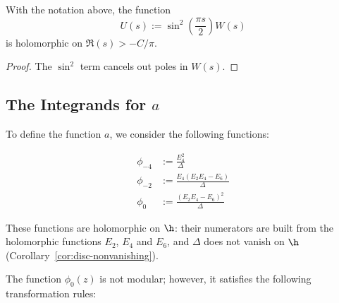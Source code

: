\begin{proposition}\label{prop:sinsq-laplace-continuation}
    With the notation above, the function
    \[
    U(s) := \sin^2\left(\frac{\pi s}{2}\right) W(s)
    \]
    is holomorphic on $\Re(s) > -C/\pi$.
\end{proposition}
\begin{proof}
    The $\sin^2$ term cancels out poles in $W(s)$.
\end{proof}

\subsection{The Integrands for $a$}

To define the function $a$, we consider the following functions:
\begin{definition}\label{def:phi4-phi2-phi0}
\leanok
\begin{align}
    \phi_{-4} &:= \frac{E_4^2}{\Delta} \label{eqn: def phi4} \\
    \phi_{-2} &:= \frac{E_4(E_2 E_4 - E_6)}{\Delta} \label{eqn: def phi2} \\
    \phi_{0} &:= \frac{(E_2 E_4 - E_6)^2}{\Delta} \label{eqn: def phi0}
\end{align}
\end{definition}

These functions are holomorphic on $\h$: their numerators are built from the holomorphic functions $E_2$, $E_4$ and $E_6$, and $\Delta$ does not vanish on $\h$ (Corollary~\ref{cor:disc-nonvanishing}).


The function $\phi_0(z)$ is not modular; however, it satisfies the following transformation rules:

